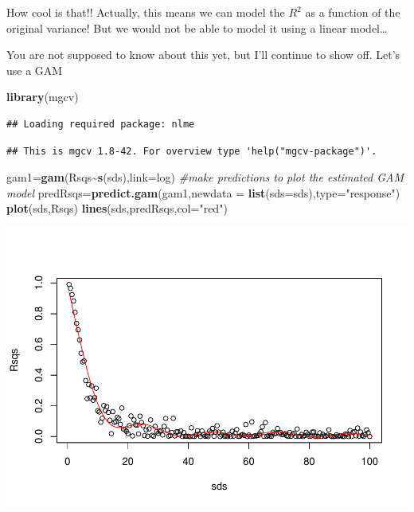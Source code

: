 \documentclass[
]{book}
\newenvironment{Shaded}{\begin{snugshade}}{\end{snugshade}}
\newcommand{\AttributeTok}[1]{\textcolor[rgb]{0.13,0.29,0.53}{#1}}
\newcommand{\CommentTok}[1]{\textcolor[rgb]{0.56,0.35,0.01}{\textit{#1}}}
\newcommand{\FunctionTok}[1]{\textcolor[rgb]{0.13,0.29,0.53}{\textbf{#1}}}
\newcommand{\NormalTok}[1]{#1}
\newcommand{\OtherTok}[1]{\textcolor[rgb]{0.56,0.35,0.01}{#1}}
\newcommand{\SpecialCharTok}[1]{\textcolor[rgb]{0.81,0.36,0.00}{\textbf{#1}}}
\newcommand{\StringTok}[1]{\textcolor[rgb]{0.31,0.60,0.02}{#1}}
\begin{document}
How cool is that!! Actually, this means we can model the \(R^2\) as a function of the original variance! But we would not be able to model it using a linear model\ldots{}

You are not supposed to know about this yet, but I'll continue to show off. Let's use a GAM

\begin{Shaded}
\begin{Highlighting}[]
\FunctionTok{library}\NormalTok{(mgcv)}
\end{Highlighting}
\end{Shaded}

\begin{verbatim}
## Loading required package: nlme
\end{verbatim}

\begin{verbatim}
## This is mgcv 1.8-42. For overview type 'help("mgcv-package")'.
\end{verbatim}

\begin{Shaded}
\begin{Highlighting}[]
\NormalTok{gam1}\OtherTok{=}\FunctionTok{gam}\NormalTok{(Rsqs}\SpecialCharTok{\textasciitilde{}}\FunctionTok{s}\NormalTok{(sds),}\AttributeTok{link=}\NormalTok{log)}
\CommentTok{\#make predictions to plot the estimated GAM model}
\NormalTok{predRsqs}\OtherTok{=}\FunctionTok{predict.gam}\NormalTok{(gam1,}\AttributeTok{newdata =} \FunctionTok{list}\NormalTok{(}\AttributeTok{sds=}\NormalTok{sds),}\AttributeTok{type=}\StringTok{"response"}\NormalTok{)}
\FunctionTok{plot}\NormalTok{(sds,Rsqs)}
\FunctionTok{lines}\NormalTok{(sds,predRsqs,}\AttributeTok{col=}\StringTok{"red"}\NormalTok{)}
\end{Highlighting}
\end{Shaded}

\includegraphics{ECOMODbook_files/figure-latex/a6.32-1.pdf}
\end{document}
